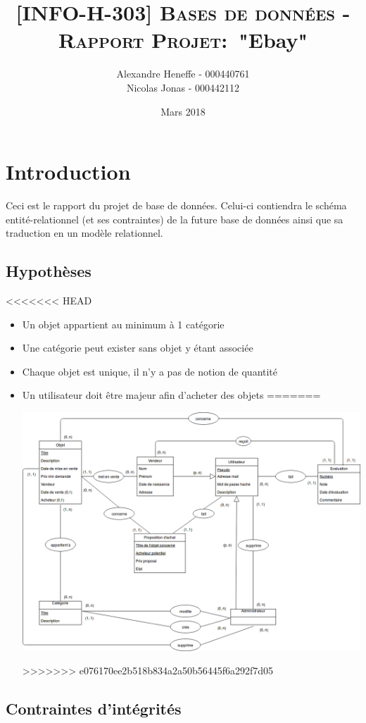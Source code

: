 \documentclass[a4paper,11pt]{article}
\title{\textsc{[INFO-H-303] Bases de données - Rapport Projet:}\
   "Ebay"}
\author{Alexandre Heneffe - 000440761\\
        Nicolas Jonas - 000442112}
\date{Mars 2018}
\begin{document}
\maketitle
\section{Introduction}

Ceci est le rapport du projet de base de données. Celui-ci contiendra le schéma entité-relationnel (et ses contraintes) de la future base de données ainsi que sa traduction en un modèle relationnel.

\subsection{Hypothèses}

<<<<<<< HEAD
\begin{itemize}[label=\textbullet]
	\item Un objet appartient au minimum à 1 catégorie
	\item Une catégorie peut exister sans objet y étant associée
	\item Chaque objet est unique, il n'y a pas de notion de quantité
	\item Un utilisateur doit être majeur afin d'acheter des objets
=======
\begin{center}
    \includegraphics[scale=0.45,left]{schemaEA}
\end{center}
>>>>>>> e076170ee2b518b834a2a50b56445f6a292f7d05

\end{itemize}

\subsection{Contraintes d'intégrités}
\end{document}
